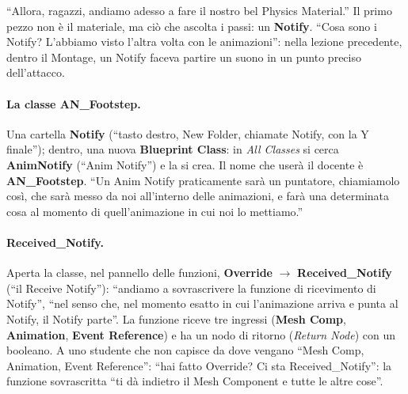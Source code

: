 ``Allora, ragazzi, andiamo adesso a fare il nostro bel Physics Material.'' Il primo pezzo
non è il materiale, ma ciò che ascolta i passi: un \textbf{Notify}. ``Cosa sono i Notify?
L'abbiamo visto l'altra volta con le animazioni'': nella lezione precedente, dentro il
Montage, un Notify faceva partire un suono in un punto preciso dell'attacco.

\paragraph{La classe AN\_Footstep.} Una cartella \textbf{Notify} (``tasto destro, New
Folder, chiamate Notify, con la Y finale''); dentro, una nuova \textbf{Blueprint Class}:
in \emph{All Classes} si cerca \textbf{AnimNotify} (``Anim Notify'') e la si crea. Il nome
che userà il docente è \textbf{AN\_Footstep}. ``Un Anim Notify praticamente sarà un
puntatore, chiamiamolo così, che sarà messo da noi all'interno delle animazioni, e farà
una determinata cosa al momento di quell'animazione in cui noi lo mettiamo.''

\paragraph{Received\_Notify.} Aperta la classe, nel pannello delle funzioni, \textbf{Override}
$\rightarrow$ \textbf{Received\_Notify} (``il Receive Notify''): ``andiamo a sovrascrivere
la funzione di ricevimento di Notify'', ``nel senso che, nel momento esatto in cui
l'animazione arriva e punta al Notify, il Notify parte''. La funzione riceve tre ingressi
(\textbf{Mesh Comp}, \textbf{Animation}, \textbf{Event Reference}) e ha un nodo di ritorno
(\emph{Return Node}) con un booleano. A uno studente che non capisce da dove vengano
``Mesh Comp, Animation, Event Reference'': ``hai fatto Override? Ci sta Received\_Notify'':
la funzione sovrascritta ``ti dà indietro il Mesh Component e tutte le altre cose''.

